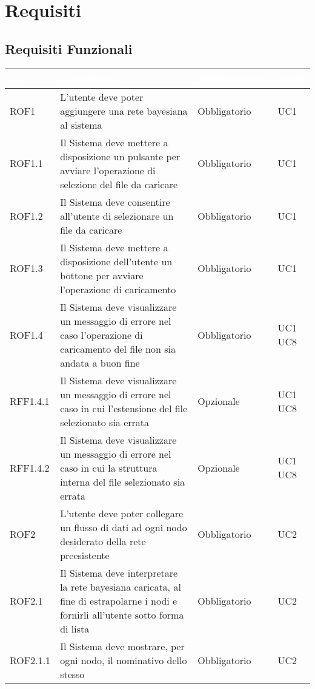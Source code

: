 \section{Requisiti}\label{Requisiti}

\subsection{Requisiti Funzionali}\label{RF}
\begin{center}
\begin{longtable}[c]{|m{}|m{}|m{}|m{}|}
\hline
\rowcolor{bluelogo}\textbf{\textcolor{white}{ID}} & \textbf{\textcolor{white}{Descrizione}} & \textbf{\textcolor{white}{Obbligatorietà}} & \textbf{\textcolor{white}{Fonti}}\\
\hline \hline
\endhead
ROF1 & L'utente deve poter aggiungere una rete bayesiana al sistema & Obbligatorio & UC1\\
\hline
\rowcolor{grigio}ROF1.1 & Il Sistema deve mettere a disposizione un pulsante per avviare l'operazione di selezione del file da caricare & Obbligatorio & UC1\\
\hline
ROF1.2 & Il Sistema deve consentire all'utente di selezionare un file da caricare & Obbligatorio & UC1\\
\hline
\rowcolor{grigio}ROF1.3 & Il Sistema deve mettere a disposizione dell'utente un bottone per avviare l'operazione di caricamento & Obbligatorio & UC1\\
\hline
ROF1.4 & Il Sistema deve visualizzare un messaggio di errore nel caso l'operazione di caricamento del file non sia andata a buon fine & Obbligatorio & UC1 UC8\\
\hline
\rowcolor{grigio}RFF1.4.1 & Il Sistema deve visualizzare un messaggio di errore nel caso in cui l'estensione del file selezionato sia errata & Opzionale & UC1 UC8\\
\hline
RFF1.4.2 & Il Sistema deve visualizzare un messaggio di errore nel caso in cui la struttura interna del file selezionato sia errata & Opzionale & UC1 UC8\\
\hline
\rowcolor{grigio}ROF2 & L'utente deve poter collegare un flusso di dati ad ogni nodo desiderato della rete preesistente & Obbligatorio & UC2\\
\hline
ROF2.1 & Il Sistema deve interpretare la rete bayesiana caricata, al fine di estrapolarne i nodi e fornirli all'utente sotto forma di lista & Obbligatorio & UC2\\
\hline
\rowcolor{grigio}ROF2.1.1 & Il Sistema deve mostrare, per ogni nodo, il nominativo dello stesso & Obbligatorio & UC2\\

\end{longtable}
\end{center}
